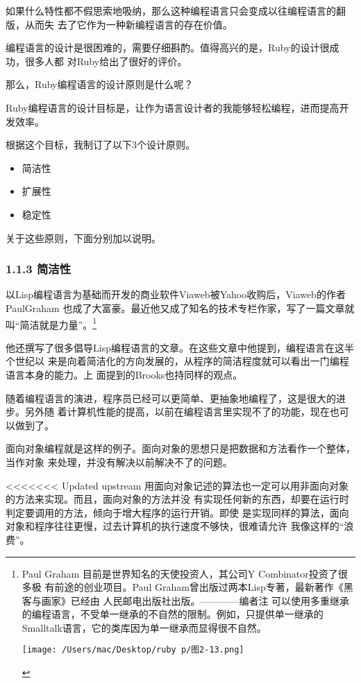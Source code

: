 \documentclass[color=cyan,mathpazo,titlestyle=hang]{elegantbook}
\begin{document}
如果什么特性都不假思索地吸纳，那么这种编程语言只会变成以往编程语言的翻版，从而失
去了它作为一种新编程语言的存在价值。

编程语言的设计是很困难的，需要仔细斟酌。值得高兴的是，Ruby的设计很成功，很多人都
对Ruby给出了很好的评价。

那么，Ruby编程语言的设计原则是什么呢？

Ruby编程语言的设计目标是，让作为语言设计者的我能够轻松编程，进而提高开发效率。

根据这个目标，我制订了以下3个设计原则。

\begin{itemize}
\item 简洁性
\item 扩展性
\item 稳定性
\end{itemize}

关于这些原则，下面分别加以说明。

\subsubsection{1.1.3 简洁性}
\label{sec:orgc921bcb}

以Lisp编程语言为基础而开发的商业软件Viaweb被Yahoo收购后，Viaweb的作者PaulGraham
也成了大富豪。最近他又成了知名的技术专栏作家，写了一篇文章就叫“简洁就是力量”。\footnote{Paul Graham 目前是世界知名的天使投资人，其公司Y Combinator投资了很多极
  有前途的创业项目。Paul Graham曾出版过两本Lisp专著，最新著作《黑客与画家》已经由
  人民邮电出版社出版。————编者注
  可以使用多重继承的编程语言，不受单一继承的不自然的限制。例如，只提供单一继承的
  Smalltalk语言，它的类库因为单一继承而显得很不自然。
  \begin{center}
    \texttt{[image: /Users/mac/Desktop/ruby p/图2-13.png]}
  \end{center}}

他还撰写了很多倡导Lisp编程语言的文章。在这些文章中他提到，编程语言在这半个世纪以
来是向着简洁化的方向发展的，从程序的简洁程度就可以看出一门编程语言本身的能力。上
面提到的Brooks也持同样的观点。

随着编程语言的演进，程序员已经可以更简单、更抽象地编程了，这是很大的进步。另外随
着计算机性能的提高，以前在编程语言里实现不了的功能，现在也可以做到了。

面向对象编程就是这样的例子。面向对象的思想只是把数据和方法看作一个整体，当作对象
来处理，并没有解决以前解决不了的问题。

<<<<<<< Updated upstream
用面向对象记述的算法也一定可以用非面向对象的方法来实现。而且，面向对象的方法并没
有实现任何新的东西，却要在运行时判定要调用的方法，倾向于增大程序的运行开销。即使
是实现同样的算法，面向对象和程序往往更慢，过去计算机的执行速度不够快，很难请允许
我像这样的“浪费”。
\end{document}
